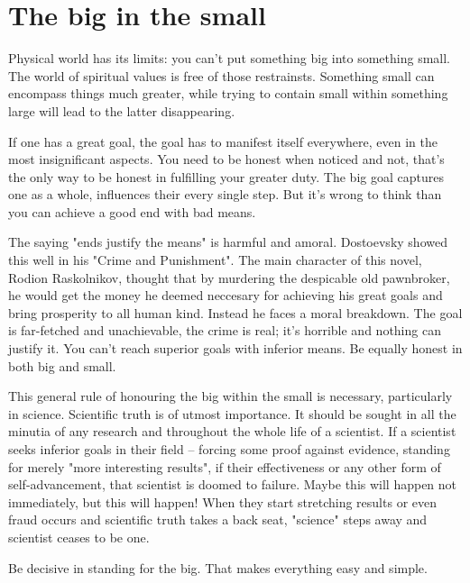 \chapter{The big in the small}

Physical world has its limits: you can't put something big into something small. The world of spiritual values is free of those restrainsts. Something small can encompass things much greater, while trying to contain small within something large will lead to the latter disappearing.

If one has a great goal, the goal has to manifest itself everywhere, even in the most insignificant aspects. You need to be honest when noticed and not, that's the only way to be honest in fulfilling your greater duty. The big goal captures one as a whole, influences their every single step. But it's wrong to think than you can achieve a good end with bad means.

The saying "ends justify the means" is harmful and amoral. Dostoevsky showed this well in his "Crime and Punishment". The main character of this novel, Rodion Raskolnikov, thought that by murdering the despicable old pawnbroker, he would get the money he deemed neccesary for achieving his great goals and bring prosperity to all human kind. Instead he faces a moral breakdown. The goal is far-fetched and unachievable, the crime is real; it's horrible and nothing can justify it. You can't reach superior goals with inferior means. Be equally honest in both big and small.

This general rule of honouring the big within the small is necessary, particularly in science. Scientific truth is of utmost importance. It should be sought in all the minutia of any research and throughout the whole life of a scientist. If a scientist seeks inferior goals in their field -- forcing some proof against evidence, standing for merely "more interesting results", if their effectiveness or any other form of self-advancement, that scientist is doomed to failure. Maybe this will happen not immediately, but this will happen! When they start stretching results or even fraud occurs and scientific truth takes a back seat, "science" steps away and scientist ceases to be one.

Be decisive in standing for the big. That makes everything easy and simple.
